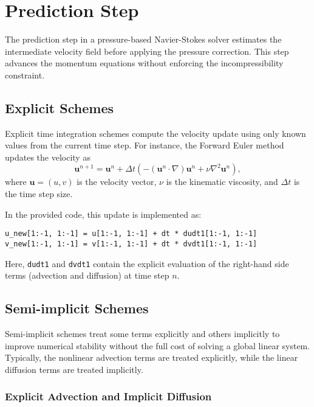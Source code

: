 \section{Prediction Step}

The prediction step in a pressure-based Navier-Stokes solver estimates the intermediate velocity field before applying the pressure correction. This step advances the momentum equations without enforcing the incompressibility constraint.

\subsection{Explicit Schemes}

Explicit time integration schemes compute the velocity update using only known values from the current time step. For instance, the Forward Euler method updates the velocity as
\begin{equation}
\mathbf{u}^{n+1} = \mathbf{u}^n + \Delta t \left( - (\mathbf{u}^n \cdot \nabla) \mathbf{u}^n + \nu \nabla^2 \mathbf{u}^n \right),
\end{equation}
where $\mathbf{u} = (u,v)$ is the velocity vector, $\nu$ is the kinematic viscosity, and $\Delta t$ is the time step size.

In the provided code, this update is implemented as:
\begin{verbatim}
u_new[1:-1, 1:-1] = u[1:-1, 1:-1] + dt * dudt1[1:-1, 1:-1]
v_new[1:-1, 1:-1] = v[1:-1, 1:-1] + dt * dvdt1[1:-1, 1:-1]
\end{verbatim}
Here, \texttt{dudt1} and \texttt{dvdt1} contain the explicit evaluation of the right-hand side terms (advection and diffusion) at time step $n$.

\subsection{Semi-implicit Schemes}

Semi-implicit schemes treat some terms explicitly and others implicitly to improve numerical stability without the full cost of solving a global linear system. Typically, the nonlinear advection terms are treated explicitly, while the linear diffusion terms are treated implicitly.

\subsubsection{Explicit Advection and Implicit Diffusion}

